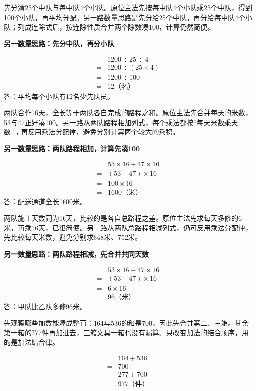 \documentclass[multi=snippet,border=0pt]{standalone}
\newenvironment{snippet}[3]{\begin{minipage}{#1bp}\color{answerred}\fontsize{#2}{#3}\selectfont\raggedright}{\end{minipage}}
\begin{document}
\begin{snippet}{505}{11.5}{14}先分清25个中队与每中队4个小队。原位主法先按每中队4个小队乘25个中队，得到100个小队，再平均分配。另一路数量思路是先分给25个中队，再分给每中队4个小队；列成连除式后，按连除性质合并两个除数凑100，计算仍然简便。\par \textbf{另一数量思路：先分中队，再分小队}\par \[\begin{aligned}&1200\div25\div4\\={}&1200\div(25\times4)\\={}&1200\div100\\={}&12\text{（名）}\end{aligned}\]答：平均每个小队有12名少先队员。\end{snippet}
\begin{snippet}{505}{11.5}{14}两队合作16天，全长等于两队各自完成的路程之和。原位主法先合并每天的米数，53与47正好凑100。另一路从两队路程相加列式，每个乘法都按“每天米数乘天数”；再反用乘法分配律，避免分别计算两个较大的乘积。\par \textbf{另一数量思路：两队路程相加，计算先凑100}\par \[\begin{aligned}&53\times16+47\times16\\={}&(53+47)\times16\\={}&100\times16\\={}&1600\text{（米）}\end{aligned}\]答：配送通道全长1600米。\end{snippet}
\begin{snippet}{505}{11.5}{14}两队施工天数同为16天，比较的是各自总路程之差。原位主法先求每天多修的6米，再乘16天，已很简便。另一路从两队总路程相减列式，仍可反用乘法分配律，先比较每天米数，避免分别求848米、752米。\par \textbf{另一数量思路：两队路程相减，先合并共同天数}\par \[\begin{aligned}&53\times16-47\times16\\={}&(53-47)\times16\\={}&6\times16\\={}&96\text{（米）}\end{aligned}\]答：甲队比乙队多修96米。\end{snippet}
\begin{snippet}{505}{11.5}{14}先观察哪些加数能凑成整百：164与536的和是700，因此先合并第二、三箱。其余第一箱的277件再加进去，三箱文具一箱也没有漏算。只改变加法的结合顺序，用的是加法结合律。\par \[\begin{aligned}&164+536\\={}&700\\&277+700\\={}&977\text{（件）}\end{aligned}\]\end{snippet}
\end{document}
